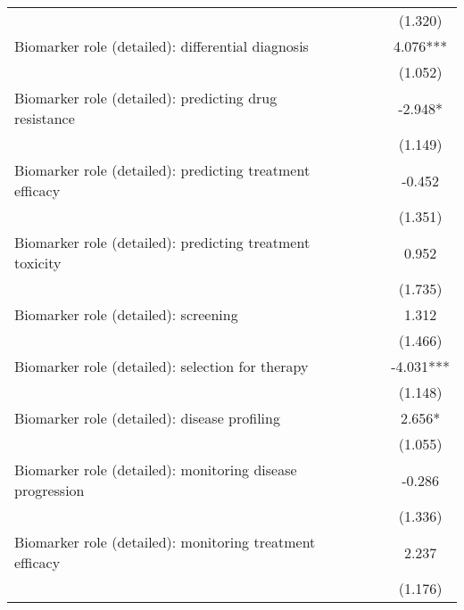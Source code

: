 \begin{table}[htb]
\begin{tabular}{l*{4}c}
                    &               &               &               &     (1.320)   \\
Biomarker role (detailed): differential diagnosis&               &               &               &       4.076***\\
                    &               &               &               &     (1.052)   \\
Biomarker role (detailed): predicting drug resistance&               &               &               &      -2.948*  \\
                    &               &               &               &     (1.149)   \\
Biomarker role (detailed): predicting treatment efficacy&               &               &               &      -0.452   \\
                    &               &               &               &     (1.351)   \\
Biomarker role (detailed): predicting treatment toxicity&               &               &               &       0.952   \\
                    &               &               &               &     (1.735)   \\
Biomarker role (detailed): screening&               &               &               &       1.312   \\
                    &               &               &               &     (1.466)   \\
Biomarker role (detailed): selection for therapy&               &               &               &      -4.031***\\
                    &               &               &               &     (1.148)   \\
Biomarker role (detailed): disease profiling&               &               &               &       2.656*  \\
                    &               &               &               &     (1.055)   \\
Biomarker role (detailed): monitoring disease progression&               &               &               &      -0.286   \\
                    &               &               &               &     (1.336)   \\
Biomarker role (detailed): monitoring treatment efficacy&               &               &               &       2.237   \\
                    &               &               &               &     (1.176)   \\

\end{tabular}
\end{table}
